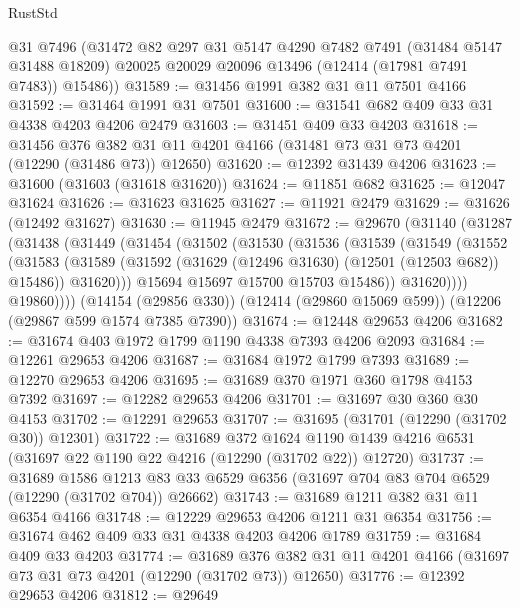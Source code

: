 \begin{lexlean}{RustStd}
\begin{coremodule}
      @31
      @7496
      (@31472
        @82
        @297
        @31
        @5147
        @4290
        @7482
        @7491
        (@31484 @5147 @31488 @18209)
        @20025
        @20029
        @20096
        @13496
        (@12414 (@17981 @7491 @7483))
        @15486))
@31589 := @31456 @1991 @382 @31 @11 @7501 @4166
@31592 := @31464 @1991 @31 @7501
@31600 := @31541 @682 @409 @33 @31 @4338 @4203 @4206 @2479
@31603 := @31451 @409 @33 @4203
@31618 := @31456
    @376
    @382
    @31
    @11
    @4201
    @4166
    (@31481 @73 @31 @73 @4201 (@12290 (@31486 @73)) @12650)
@31620 := @12392 @31439 @4206
@31623 := @31600 (@31603 (@31618 @31620))
@31624 := @11851 @682
@31625 := @12047 @31624
@31626 := @31623 @31625
@31627 := @11921 @2479
@31629 := @31626 (@12492 @31627)
@31630 := @11945 @2479
@31672 := @29670
    (@31140
      (@31287
        (@31438
          (@31449
            (@31454
              (@31502
                (@31530
                  (@31536
                    (@31539
                      (@31549
                        (@31552
                          (@31583
                            (@31589
                              (@31592 (@31629 (@12496 @31630) (@12501 (@12503 @682)) @15486))
                              @31620)))
                        @15694
                        @15697
                        @15700
                        @15703
                        @15486))
                    @31620))))
            @19860))))
    (@14154 (@29856 @330))
    (@12414 (@29860 @15069 @599))
    (@12206 (@29867 @599 @1574 @7385 @7390))
@31674 := @12448 @29653 @4206
@31682 := @31674 @403 @1972 @1799 @1190 @4338 @7393 @4206 @2093
@31684 := @12261 @29653 @4206
@31687 := @31684 @1972 @1799 @7393
@31689 := @12270 @29653 @4206
@31695 := @31689 @370 @1971 @360 @1798 @4153 @7392
@31697 := @12282 @29653 @4206
@31701 := @31697 @30 @360 @30 @4153
@31702 := @12291 @29653
@31707 := @31695 (@31701 (@12290 (@31702 @30)) @12301)
@31722 := @31689
    @372
    @1624
    @1190
    @1439
    @4216
    @6531
    (@31697 @22 @1190 @22 @4216 (@12290 (@31702 @22)) @12720)
@31737 := @31689
    @1586
    @1213
    @83
    @33
    @6529
    @6356
    (@31697 @704 @83 @704 @6529 (@12290 (@31702 @704)) @26662)
@31743 := @31689 @1211 @382 @31 @11 @6354 @4166
@31748 := @12229 @29653 @4206 @1211 @31 @6354
@31756 := @31674 @462 @409 @33 @31 @4338 @4203 @4206 @1789
@31759 := @31684 @409 @33 @4203
@31774 := @31689
    @376
    @382
    @31
    @11
    @4201
    @4166
    (@31697 @73 @31 @73 @4201 (@12290 (@31702 @73)) @12650)
@31776 := @12392 @29653 @4206
@31812 := @29649

\end{coremodule}
\end{lexlean}
